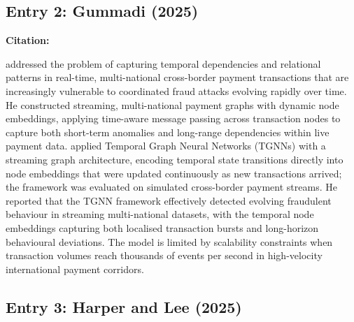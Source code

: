 \documentclass[12pt, a4paper]{article}
\newenvironment{surveyentry}[1]{%
  \vspace{6pt}
  \noindent\textbf{\color{navyblue}#1}\par
  \vspace{2pt}
  \noindent\hspace{1em}%
  \begin{minipage}[t]{0.97\linewidth}
}{%
  \end{minipage}
  \vspace{10pt}
}
\begin{document}
\subsection*{Entry 2: Gummadi (2025)}

\begin{surveyentry}{Citation: \cite{gummadi2025temporal}}
\cite{gummadi2025temporal} addressed the problem of capturing temporal dependencies and relational patterns in real-time, multi-national cross-border payment transactions that are increasingly vulnerable to coordinated fraud attacks evolving rapidly over time. He constructed streaming, multi-national payment graphs with dynamic node embeddings, applying time-aware message passing across transaction nodes to capture both short-term anomalies and long-range dependencies within live payment data. \cite{gummadi2025temporal} applied Temporal Graph Neural Networks (TGNNs) with a streaming graph architecture, encoding temporal state transitions directly into node embeddings that were updated continuously as new transactions arrived; the framework was evaluated on simulated cross-border payment streams. He reported that the TGNN framework effectively detected evolving fraudulent behaviour in streaming multi-national datasets, with the temporal node embeddings capturing both localised transaction bursts and long-horizon behavioural deviations. The model is limited by scalability constraints when transaction volumes reach thousands of events per second in high-velocity international payment corridors.
\end{surveyentry}

\subsection*{Entry 3: Harper and Lee (2025)}
\end{document}
